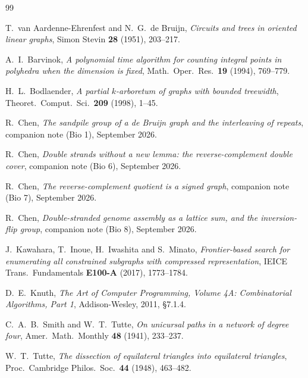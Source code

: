 \documentclass[11pt]{article}
\theoremstyle{plain}
\theoremstyle{definition}
\theoremstyle{remark}
\begin{document}
\begin{thebibliography}{99}

 T.~van Aardenne-Ehrenfest and N.~G.~de Bruijn, \emph{Circuits and trees in
oriented linear graphs}, Simon Stevin \textbf{28} (1951), 203--217.

 A.~I.~Barvinok, \emph{A polynomial time algorithm for counting integral
points in polyhedra when the dimension is fixed}, Math.\ Oper.\ Res.\ \textbf{19} (1994),
769--779.

 H.~L.~Bodlaender, \emph{A partial $k$-arboretum of graphs with bounded
treewidth}, Theoret.\ Comput.\ Sci.\ \textbf{209} (1998), 1--45.

 R.~Chen, \emph{The sandpile group of a de Bruijn graph and the interleaving of
repeats}, companion note (Bio 1), September 2026.

 R.~Chen, \emph{Double strands without a new lemma: the reverse-complement
double cover}, companion note (Bio 6), September 2026.

 R.~Chen, \emph{The reverse-complement quotient is a signed graph}, companion
note (Bio 7), September 2026.

 R.~Chen, \emph{Double-stranded genome assembly as a lattice sum, and the
inversion-flip group}, companion note (Bio 8), September 2026.

 J.~Kawahara, T.~Inoue, H.~Iwashita and S.~Minato, \emph{Frontier-based search
for enumerating all constrained subgraphs with compressed representation}, IEICE Trans.\
Fundamentals \textbf{E100-A} (2017), 1773--1784.

 D.~E.~Knuth, \emph{The Art of Computer Programming, Volume 4A:
Combinatorial Algorithms, Part 1}, Addison-Wesley, 2011, \S7.1.4.

 C.~A.~B.~Smith and W.~T.~Tutte, \emph{On unicursal paths in a network of
degree four}, Amer.\ Math.\ Monthly \textbf{48} (1941), 233--237.

 W.~T.~Tutte, \emph{The dissection of equilateral triangles into equilateral
triangles}, Proc.\ Cambridge Philos.\ Soc.\ \textbf{44} (1948), 463--482.

\end{thebibliography}
\end{document}
